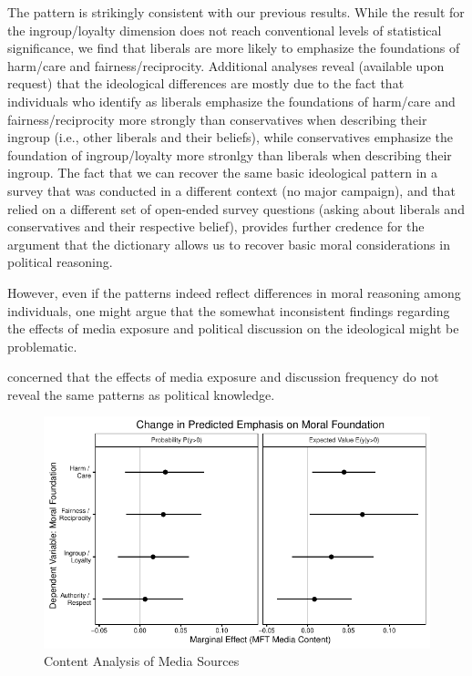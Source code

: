 \documentclass[12pt]{article}
\begin{document}
The pattern is strikingly consistent with our previous results. While the result for the ingroup/loyalty dimension does not reach conventional levels of statistical significance, we find that liberals are more likely to emphasize the foundations of harm/care and fairness/reciprocity. Additional analyses reveal (available upon request) that the ideological differences are mostly due to the fact that individuals who identify as liberals emphasize the foundations of harm/care and fairness/reciprocity more strongly than conservatives when describing their ingroup (i.e., other liberals and their beliefs), while conservatives emphasize the foundation of ingroup/loyalty more stronlgy than liberals when describing their ingroup. The fact that we can recover the same basic ideological pattern in a survey that was conducted in a different context (no major campaign), and that relied on a different set of open-ended survey questions (asking about liberals and conservatives and their respective belief), provides further credence for the argument that the dictionary allows us to recover basic moral considerations in political reasoning.

However, even if the patterns indeed reflect differences in moral reasoning among individuals, one might argue that the somewhat inconsistent findings regarding the effects of media exposure and political discussion on the ideological might be problematic. 

 concerned that the effects of media exposure and discussion frequency do not reveal the same patterns as political knowledge.


\begin{figure}[ht]\centering
\includegraphics{../calc/fig/tobit_media.pdf}
\caption{Content Analysis of Media Sources
}\label{fig:tobit_media}
\end{figure}
\end{document}
